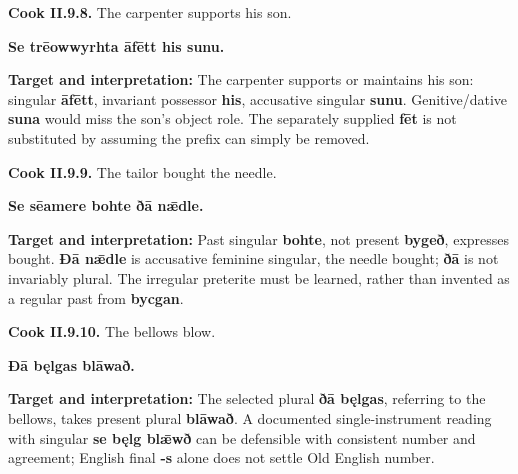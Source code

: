 \par\begin{minipage}{\linewidth}\raggedright
\textbf{Cook II.9.8.} The carpenter supports his son.

\textbf{Se trēowwyrhta āfētt his sunu.}

\textbf{Target and interpretation:} The carpenter supports or maintains his son: singular \textbf{āfētt}, invariant possessor \textbf{his}, accusative singular \textbf{sunu}. Genitive/\allowbreak{}dative \textbf{suna} would miss the son's object role. The separately supplied \textbf{fēt} is not substituted by assuming the prefix can simply be removed.

\end{minipage}\par\addvspace{4pt}

\par\begin{minipage}{\linewidth}\raggedright
\textbf{Cook II.9.9.} The tailor bought the needle.

\textbf{Se sēamere bohte ðā nǣdle.}

\textbf{Target and interpretation:} Past singular \textbf{bohte}, not present \textbf{bygeð}, expresses bought. \textbf{Ðā nǣdle} is accusative feminine singular, the needle bought; \textbf{ðā} is not invariably plural. The irregular preterite must be learned, rather than invented as a regular past from \textbf{bycgan}.

\end{minipage}\par\addvspace{4pt}

\par\begin{minipage}{\linewidth}\raggedright
\textbf{Cook II.9.10.} The bellows blow.

\textbf{Ðā bęlgas blāwað.}

\textbf{Target and interpretation:} The selected plural \textbf{ðā bęlgas}, referring to the bellows, takes present plural \textbf{blāwað}. A documented single-instrument reading with singular \textbf{se bęlg blǣwð} can be defensible with consistent number and agreement; English final \textbf{-s} alone does not settle Old English number.

\end{minipage}\par\addvspace{4pt}

